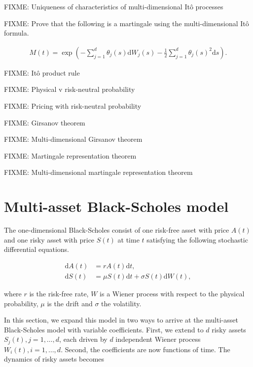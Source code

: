 \documentclass[a4paper]{article}
\begin{document}
FIXME: Uniqueness of characteristics of multi-dimensional It\^o processes

FIXME: Prove that the following is a martingale using the multi-dimensional It\^o formula.

\begin{align}\label{eq:exp-sums-martingale}
  M(t) = \exp \left( - \sum_{j=1}^{d} \theta_j(s) \mathrm{d}W_j(s) - \frac{1}{2} \sum_{j=1}^{d} \theta_j(s)^2 \mathrm{d}s \right).
\end{align}

FIXME: It\^o product rule

FIXME: Physical v risk-neutral probability

FIXME: Pricing with risk-neutral probability

FIXME: Girsanov theorem

FIXME: Multi-dimensional Girsanov theorem

FIXME: Martingale representation theorem

FIXME: Multi-dimensional martingale representation theorem

\pagebreak
\section{Multi-asset Black-Scholes model}


The one-dimensional Black-Scholes consist of one risk-free asset with price $A(t)$ and one risky asset with price $S(t)$ at time $t$ satisfying the following stochastic differential equations.

\begin{align*}
  \mathrm{d}A(t) &= r A(t) \mathrm{d}t,\\
  \mathrm{d}S(t) &= \mu S(t) \mathrm{d}t + \sigma S(t) \mathrm{d}W(t),
\end{align*}

where $r$ is the risk-free rate, $W$ is a Wiener process with respect to the physical probability, $\mu$ is the drift and $\sigma$ the volatility.

In this section, we expand this model in two ways to arrive at the multi-asset Black-Scholes model with variable coefficients. First, we extend to $d$ risky assets $S_j(t), j =  1, \ldots, d$, each driven by $d$ independent Wiener process $W_i(t), i = 1, \ldots, d$. Second, the coefficients are now functions of time. The dynamics of risky assets becomes
\end{document}
